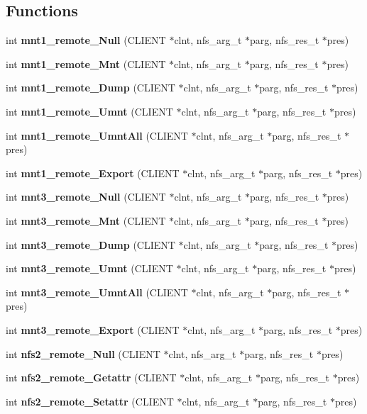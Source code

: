 \subsection*{Functions}
\begin{CompactItemize}
\item 
int {\bf mnt1\_\-remote\_\-Null} (CLIENT $\ast$clnt, nfs\_\-arg\_\-t $\ast$parg, nfs\_\-res\_\-t $\ast$pres)
\item 
int {\bf mnt1\_\-remote\_\-Mnt} (CLIENT $\ast$clnt, nfs\_\-arg\_\-t $\ast$parg, nfs\_\-res\_\-t $\ast$pres)
\item 
int {\bf mnt1\_\-remote\_\-Dump} (CLIENT $\ast$clnt, nfs\_\-arg\_\-t $\ast$parg, nfs\_\-res\_\-t $\ast$pres)
\item 
int {\bf mnt1\_\-remote\_\-Umnt} (CLIENT $\ast$clnt, nfs\_\-arg\_\-t $\ast$parg, nfs\_\-res\_\-t $\ast$pres)
\item 
int {\bf mnt1\_\-remote\_\-Umnt\-All} (CLIENT $\ast$clnt, nfs\_\-arg\_\-t $\ast$parg, nfs\_\-res\_\-t $\ast$pres)
\item 
int {\bf mnt1\_\-remote\_\-Export} (CLIENT $\ast$clnt, nfs\_\-arg\_\-t $\ast$parg, nfs\_\-res\_\-t $\ast$pres)
\item 
int {\bf mnt3\_\-remote\_\-Null} (CLIENT $\ast$clnt, nfs\_\-arg\_\-t $\ast$parg, nfs\_\-res\_\-t $\ast$pres)
\item 
int {\bf mnt3\_\-remote\_\-Mnt} (CLIENT $\ast$clnt, nfs\_\-arg\_\-t $\ast$parg, nfs\_\-res\_\-t $\ast$pres)
\item 
int {\bf mnt3\_\-remote\_\-Dump} (CLIENT $\ast$clnt, nfs\_\-arg\_\-t $\ast$parg, nfs\_\-res\_\-t $\ast$pres)
\item 
int {\bf mnt3\_\-remote\_\-Umnt} (CLIENT $\ast$clnt, nfs\_\-arg\_\-t $\ast$parg, nfs\_\-res\_\-t $\ast$pres)
\item 
int {\bf mnt3\_\-remote\_\-Umnt\-All} (CLIENT $\ast$clnt, nfs\_\-arg\_\-t $\ast$parg, nfs\_\-res\_\-t $\ast$pres)
\item 
int {\bf mnt3\_\-remote\_\-Export} (CLIENT $\ast$clnt, nfs\_\-arg\_\-t $\ast$parg, nfs\_\-res\_\-t $\ast$pres)
\item 
int {\bf nfs2\_\-remote\_\-Null} (CLIENT $\ast$clnt, nfs\_\-arg\_\-t $\ast$parg, nfs\_\-res\_\-t $\ast$pres)
\item 
int {\bf nfs2\_\-remote\_\-Getattr} (CLIENT $\ast$clnt, nfs\_\-arg\_\-t $\ast$parg, nfs\_\-res\_\-t $\ast$pres)
\item 
int {\bf nfs2\_\-remote\_\-Setattr} (CLIENT $\ast$clnt, nfs\_\-arg\_\-t $\ast$parg, nfs\_\-res\_\-t $\ast$pres)

\end{CompactItemize}
